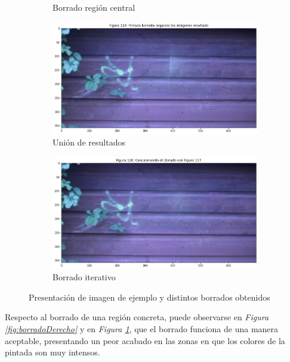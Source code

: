\documentclass[11pt,twoside,titlepage,a4paper]{article}
\numberwithin{equation}{section} %
\theoremstyle{usual}
\begin{document}
\begin{figure}[h]
\begin{subfigure}[t]{.3\textwidth}
        \caption{Borrado región central}
        \label{fig:borradoCentral}
    \end{subfigure}
    \centering
    \begin{subfigure}[t]{.3\textwidth}
        \centering
        \includegraphics[width=\textwidth]{imagenes/PoissonImageEditing_cell_118_output_4.png}
        \caption{Unión de resultados}
        \label{fig:borradoUnion}
    \end{subfigure}
    \centering
    \begin{subfigure}[t]{.3\textwidth}
        \centering
        \includegraphics[width=\textwidth]{imagenes/PoissonImageEditing_cell_118_output_5.png}
        \caption{Borrado iterativo}
        \label{fig:borradoIterativo}
    \end{subfigure}
    \caption{Presentación de imagen de ejemplo y distintos borrados obtenidos}
    \label{fig:resultadosBorradoImágenes}
\end{figure}

Respecto al borrado de una región concreta, puede observarse en \textit{Figura \ref{fig:borradoDerecho}} y en \textit{Figura \ref{fig:borradoCentral}}, que el borrado funciona de una manera aceptable, presentando un peor acabado en las zonas en que los colores de la pintada son muy intensos. 
\end{document}
